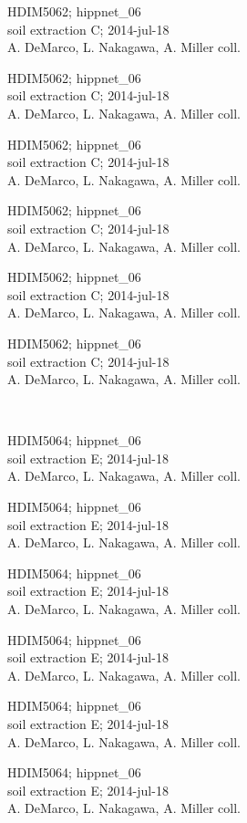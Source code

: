 \documentclass[2pt]{extarticle}
\begin{document}
\noindent
\parbox{0.16\textwidth}{\tiny \raggedright \rule[-0.3\baselineskip]{0pt}{10pt}HDIM5062; hippnet\_06\\ soil extraction C; 2014-jul-18\\ A. DeMarco, L. Nakagawa, A. Miller coll.}
\parbox{0.16\textwidth}{\tiny \raggedright \rule[-0.3\baselineskip]{0pt}{10pt}HDIM5062; hippnet\_06\\ soil extraction C; 2014-jul-18\\ A. DeMarco, L. Nakagawa, A. Miller coll.}
\parbox{0.16\textwidth}{\tiny \raggedright \rule[-0.3\baselineskip]{0pt}{10pt}HDIM5062; hippnet\_06\\ soil extraction C; 2014-jul-18\\ A. DeMarco, L. Nakagawa, A. Miller coll.}
\parbox{0.16\textwidth}{\tiny \raggedright \rule[-0.3\baselineskip]{0pt}{10pt}HDIM5062; hippnet\_06\\ soil extraction C; 2014-jul-18\\ A. DeMarco, L. Nakagawa, A. Miller coll.}
\parbox{0.16\textwidth}{\tiny \raggedright \rule[-0.3\baselineskip]{0pt}{10pt}HDIM5062; hippnet\_06\\ soil extraction C; 2014-jul-18\\ A. DeMarco, L. Nakagawa, A. Miller coll.}
\parbox{0.16\textwidth}{\tiny \raggedright \rule[-0.3\baselineskip]{0pt}{10pt}HDIM5062; hippnet\_06\\ soil extraction C; 2014-jul-18\\ A. DeMarco, L. Nakagawa, A. Miller coll.} \\ 
\vspace{0.001in} 

\noindent
\parbox{0.16\textwidth}{\tiny \raggedright \rule[-0.3\baselineskip]{0pt}{10pt}HDIM5064; hippnet\_06\\ soil extraction E; 2014-jul-18\\ A. DeMarco, L. Nakagawa, A. Miller coll.}
\parbox{0.16\textwidth}{\tiny \raggedright \rule[-0.3\baselineskip]{0pt}{10pt}HDIM5064; hippnet\_06\\ soil extraction E; 2014-jul-18\\ A. DeMarco, L. Nakagawa, A. Miller coll.}
\parbox{0.16\textwidth}{\tiny \raggedright \rule[-0.3\baselineskip]{0pt}{10pt}HDIM5064; hippnet\_06\\ soil extraction E; 2014-jul-18\\ A. DeMarco, L. Nakagawa, A. Miller coll.}
\parbox{0.16\textwidth}{\tiny \raggedright \rule[-0.3\baselineskip]{0pt}{10pt}HDIM5064; hippnet\_06\\ soil extraction E; 2014-jul-18\\ A. DeMarco, L. Nakagawa, A. Miller coll.}
\parbox{0.16\textwidth}{\tiny \raggedright \rule[-0.3\baselineskip]{0pt}{10pt}HDIM5064; hippnet\_06\\ soil extraction E; 2014-jul-18\\ A. DeMarco, L. Nakagawa, A. Miller coll.}
\parbox{0.16\textwidth}{\tiny \raggedright \rule[-0.3\baselineskip]{0pt}{10pt}HDIM5064; hippnet\_06\\ soil extraction E; 2014-jul-18\\ A. DeMarco, L. Nakagawa, A. Miller coll.} \\ 
\vspace{0.001in} 
\end{document}

